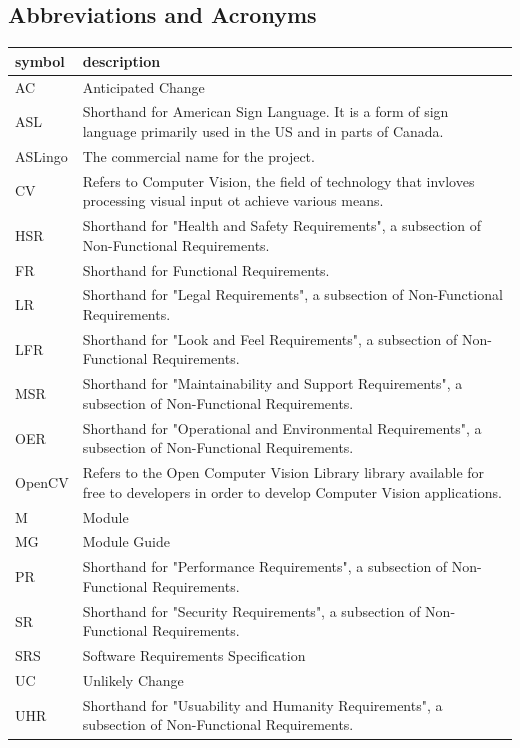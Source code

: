 \documentclass[12pt, titlepage]{article}
\begin{document}
\subsection{Abbreviations and Acronyms}

\renewcommand{\arraystretch}{1.2}
\begin{tabular}{|p{3cm}|p{13cm}|} 
  \toprule		
  \textbf{symbol} & \textbf{description}\\
  \midrule 
  AC & Anticipated Change\\
  ASL & Shorthand for American Sign Language. It is a form of sign language primarily used in the US and in parts of Canada. \\
  ASLingo & The commercial name for the project. \\
  CV & Refers to Computer Vision, the field of technology that invloves processing visual input ot achieve various means. \\
  HSR & Shorthand for "Health and Safety Requirements", a subsection of Non-Functional Requirements. \\
  FR & Shorthand for Functional Requirements. \\
  LR & Shorthand for "Legal Requirements", a subsection of Non-Functional Requirements. \\
  LFR & Shorthand for "Look and Feel Requirements", a subsection of Non-Functional Requirements. \\
  MSR & Shorthand for "Maintainability and Support Requirements", a subsection of Non-Functional Requirements. \\
  OER & Shorthand for "Operational and Environmental Requirements", a subsection of Non-Functional Requirements. \\
  OpenCV & Refers to the Open Computer Vision Library library available for free to developers in order to develop Computer Vision applications. \\
  M & Module \\
  MG & Module Guide \\
  PR & Shorthand for "Performance Requirements", a subsection of Non-Functional Requirements. \\
  SR & Shorthand for "Security Requirements", a subsection of Non-Functional Requirements. \\
  SRS & Software Requirements Specification\\
  UC & Unlikely Change \\
  UHR & Shorthand for "Usuability and Humanity Requirements", a subsection of Non-Functional Requirements. \\
  \bottomrule
\end{tabular}\\
\end{document}
